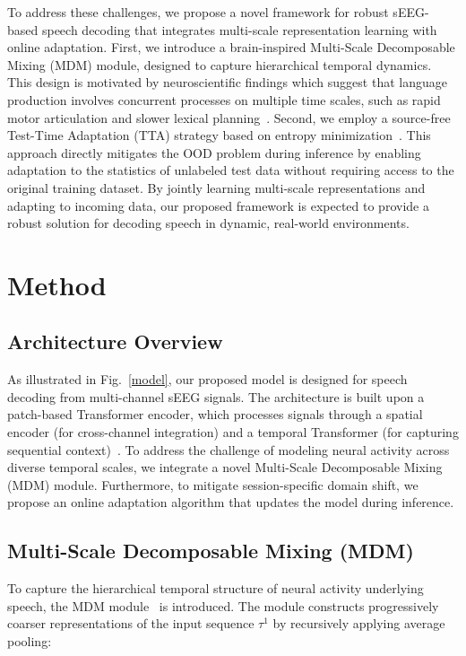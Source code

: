 \documentclass{article}
\begin{document}
To address these challenges, we propose a novel framework for robust sEEG-based speech decoding that integrates multi-scale representation learning with online adaptation. First, we introduce a brain-inspired Multi-Scale Decomposable Mixing (MDM) module, designed to capture hierarchical temporal dynamics. This design is motivated by neuroscientific findings which suggest that language production involves concurrent processes on multiple time scales, such as rapid motor articulation and slower lexical planning~\cite{levelt1999theory,hagoort2004integration}. Second, we employ a source-free Test-Time Adaptation (TTA) strategy based on entropy minimization~\cite{xiao2024beyond,sun2020test}. This approach directly mitigates the OOD problem during inference by enabling adaptation to the statistics of unlabeled test data without requiring access to the original training dataset. By jointly learning multi-scale representations and adapting to incoming data, our proposed framework is expected to provide a robust solution for decoding speech in dynamic, real-world environments.



\section{Method}

\subsection{Architecture Overview}

As illustrated in Fig.~\ref{model}, our proposed model is designed for speech decoding from multi-channel sEEG signals. The architecture is built upon a patch-based Transformer encoder, which processes signals through a spatial encoder (for cross-channel integration) and a temporal Transformer (for capturing sequential context)~\cite{zheng2024discrete}. To address the challenge of modeling neural activity across diverse temporal scales, we integrate a novel Multi-Scale Decomposable Mixing (MDM) module. Furthermore, to mitigate session-specific domain shift, we propose an online adaptation algorithm that updates the model during inference.

\subsection{Multi-Scale Decomposable Mixing (MDM)}

To capture the hierarchical temporal structure of neural activity underlying speech, the MDM module~\cite{horstemeyer2009multiscale} is introduced. The module constructs progressively coarser representations of the input sequence $\tau^1$ by recursively applying average pooling:
\end{document}
